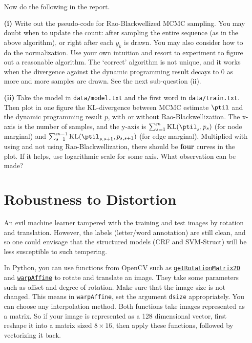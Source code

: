 \documentclass[11pt]{report}
\begin{document}
\begin{itemize}
	Now do the following in the report.
	
	\textbf{(i)}  Write out the pseudo-code for Rao-Blackwellized MCMC sampling.  
	You may doubt when to update the count:
	after sampling the entire sequence (as in the above algorithm),
	or right after each $y_k$ is drawn.
	You may also consider how to do the normalization.
	Use your own intuition and resort to experiment to figure out a reasonable algorithm.
	The `correct' algorithm is not unique, and it works when the divergence against the dynamic programming result decays to 0 as more and more samples are drawn.
	See the next sub-question (ii).
	
	\textbf{(ii)} Take the model in \verb#data/model.txt# and the first word in \verb#data/train.txt#. Then plot in one figure the KL-divergence between MCMC estimate $\ptil$ and the dynamic programming result $p$, with or without Rao-Blackwellization.
	The x-axis is the number of samples,
	and the y-axis is 
	$\sum_{s=1}^m \text{KL}(\ptil_s, p_s)$ (for node marginal) and 
	$\sum_{s=1}^{m-1} \text{KL}(\ptil_{s,s+1}, p_{s,s+1})$ (for edge marginal).
	Multiplied with using and not using Rao-Blackwellization,
	there should be \textbf{four} curves in the plot.
	If it helps, use logarithmic scale for some axis.
	What observation can be made?
\end{itemize}




\section{Robustness to Distortion}

An evil machine learner tampered with the training and test images by rotation and translation.
However, the labels (letter/word annotation) are still clean, and so
one could envisage that the structured models (CRF and SVM-Struct) will be less susceptible to such tempering.



In Python, you can use functions from OpenCV such as
\href{https://docs.opencv.org/3.4/da/d54/group__imgproc__transform.html#gafbbc470ce83812914a70abfb604f4326}{\texttt{getRotationMatrix2D}} and \href{https://docs.opencv.org/3.4/da/d54/group__imgproc__transform.html#ga0203d9ee5fcd28d40dbc4a1ea4451983}{\texttt{warpAffine}} to rotate and translate an image. 
They take some parameters such as offset and degree of rotation.
Make sure that the image size is not changed. 
This means in \texttt{warpAffine}, set the argument \verb#dsize# appropriately.
You can choose any interpolation method.
%
Both functions take images represented as a matrix.
So if your image is represented as a 128 dimensional vector,
first reshape it into a matrix sized $8 \times 16$,
then apply these functions,
followed by vectorizing it back.
\end{document}
